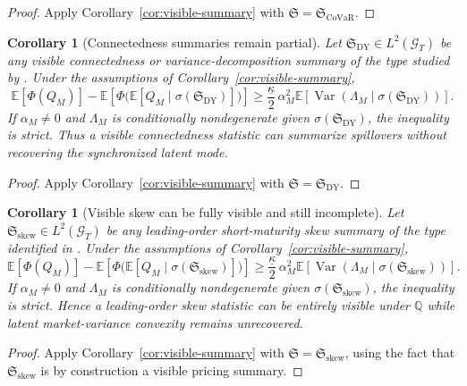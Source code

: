\documentclass[11pt,a4paper]{amsart}
\theoremstyle{plain}
\newtheorem{corollary}[theorem]{Corollary}
\theoremstyle{definition}
\theoremstyle{remark}
\DeclareMathOperator{\Var}{Var}
\newcommand{\QQ}{\mathbb{Q}}
\newcommand{\EE}{\mathbb{E}}
\newcommand{\cG}{\mathcal{G}}
\begin{document}
\begin{proof}
Apply Corollary~\ref{cor:visible-summary} with
\(\mathfrak S=\mathfrak S_{\mathrm{CoVaR}}\).
\end{proof}

\begin{corollary}[Connectedness summaries remain partial]\label{cor:connectedness-summary}
Let \(\mathfrak S_{\mathrm{DY}}\in L^2(\cG_T)\) be any visible connectedness or
variance-decomposition summary of the type studied by
\cite{diebold2009spillovers,diebold2014connectedness}.  Under the assumptions of
Corollary~\ref{cor:visible-summary},
\[
        \EE[\Phi(Q_M)]
        -
        \EE\!\left[\Phi\!\bigl(\EE[Q_M\mid \sigma(\mathfrak S_{\mathrm{DY}})]\bigr)\right]
        \ge
        \frac{\underline\kappa}{2}\,
        \alpha_M^2
        \EE\!\left[\Var(\Lambda_M\mid \sigma(\mathfrak S_{\mathrm{DY}}))\right].
\]
If \(\alpha_M\neq0\) and \(\Lambda_M\) is conditionally nondegenerate given
\(\sigma(\mathfrak S_{\mathrm{DY}})\), the inequality is strict.  Thus a visible connectedness
statistic can summarize spillovers without recovering the synchronized latent mode.
\end{corollary}

\begin{proof}
Apply Corollary~\ref{cor:visible-summary} with
\(\mathfrak S=\mathfrak S_{\mathrm{DY}}\).
\end{proof}

\begin{corollary}[Visible skew can be fully visible and still incomplete]\label{cor:visible-skew}
Let \(\mathfrak S_{\mathrm{skew}}\in L^2(\cG_T)\) be any leading-order short-maturity skew summary of
the type identified in \cite{vidal2026latent}.  Under the assumptions of
Corollary~\ref{cor:visible-summary},
\[
        \EE[\Phi(Q_M)]
        -
        \EE\!\left[\Phi\!\bigl(\EE[Q_M\mid \sigma(\mathfrak S_{\mathrm{skew}})]\bigr)\right]
        \ge
        \frac{\underline\kappa}{2}\,
        \alpha_M^2
        \EE\!\left[\Var(\Lambda_M\mid \sigma(\mathfrak S_{\mathrm{skew}}))\right].
\]
If \(\alpha_M\neq0\) and \(\Lambda_M\) is conditionally nondegenerate given
\(\sigma(\mathfrak S_{\mathrm{skew}})\), the inequality is strict.  Hence a leading-order skew
statistic can be entirely visible under \(\QQ\) while latent market-variance convexity remains
unrecovered.
\end{corollary}

\begin{proof}
Apply Corollary~\ref{cor:visible-summary} with
\(\mathfrak S=\mathfrak S_{\mathrm{skew}}\), using the fact that \(\mathfrak S_{\mathrm{skew}}\) is
by construction a visible pricing summary.
\end{proof}
\end{document}
